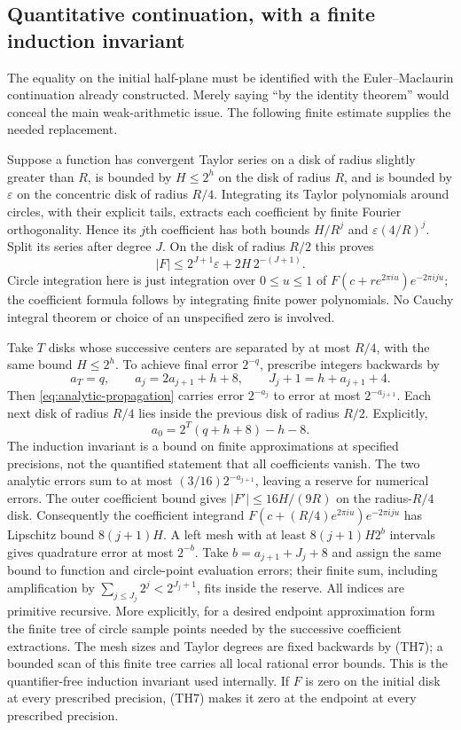 \subsection{Quantitative continuation, with a finite induction invariant}
\label{subsec:theta-overlap}

The equality on the initial half-plane must be identified with the
Euler--Maclaurin continuation already constructed.  Merely saying
``by the identity theorem'' would conceal the main weak-arithmetic
issue.  The following finite estimate supplies the needed replacement.

Suppose a function has convergent Taylor series on a disk of radius
slightly greater than $R$, is bounded by $H\le2^h$ on the disk of
radius $R$, and is bounded by $\varepsilon$ on the concentric disk of
radius $R/4$.  Integrating its Taylor polynomials around circles,
with their explicit tails, extracts each coefficient by finite Fourier
orthogonality.  Hence its $j$th coefficient has both bounds
$H/R^j$ and $\varepsilon(4/R)^j$.  Split its series after degree $J$.
On the disk of radius $R/2$ this proves
\begin{equation}
 |F|\le 2^{J+1}\varepsilon+2H\,2^{-(J+1)}.
 \label{eq:analytic-propagation}
\end{equation}
Circle integration here is just integration over $0\le u\le1$ of
$F(c+re^{2\pi iu})e^{-2\pi iju}$; the coefficient formula follows by
integrating finite power polynomials.  No Cauchy integral theorem or
choice of an unspecified zero is involved.

Take $T$ disks whose successive centers are separated by at most
$R/4$, with the same bound $H\le2^h$.  To achieve final error
$2^{-q}$, prescribe integers backwards by
\[
 a_T=q,\qquad a_j=2a_{j+1}+h+8,
 \qquad J_j+1=h+a_{j+1}+4.                          \tag{TH7}
\]
Then \eqref{eq:analytic-propagation} carries error $2^{-a_j}$ to
error at most $2^{-a_{j+1}}$.  Each next disk of radius $R/4$ lies
inside the previous disk of radius $R/2$.  Explicitly,
\[
 a_0=2^T(q+h+8)-h-8.
\]
The induction invariant is a bound on finite approximations at
specified precisions, not the quantified statement that all
coefficients vanish.  The two analytic errors sum to at most
$(3/16)2^{-a_{j+1}}$, leaving a reserve for numerical errors.
The outer coefficient bound gives
$|F'|\le16H/(9R)$ on the radius-$R/4$ disk. Consequently the coefficient
integrand
$F(c+(R/4)e^{2\pi iu})e^{-2\pi iju}$ has Lipschitz bound
$8(j+1)H$. A left mesh with at least $8(j+1)H2^b$ intervals gives
quadrature error at most $2^{-b}$. Take
$b=a_{j+1}+J_j+8$ and assign the same bound to function and circle-point
evaluation errors; their finite sum, including amplification by
$\sum_{j\le J_j}2^j<2^{J_j+1}$, fits inside the reserve.
All indices are primitive recursive. More explicitly, for a desired
endpoint approximation form the finite tree of circle sample points
needed by the successive coefficient extractions.  The mesh sizes and
Taylor degrees are fixed backwards by (TH7); a bounded scan of this
finite tree carries all local rational error bounds.  This is the
quantifier-free induction invariant used internally.  If $F$ is zero on the
initial disk at every prescribed precision, (TH7) makes it zero at
the endpoint at every prescribed precision.

